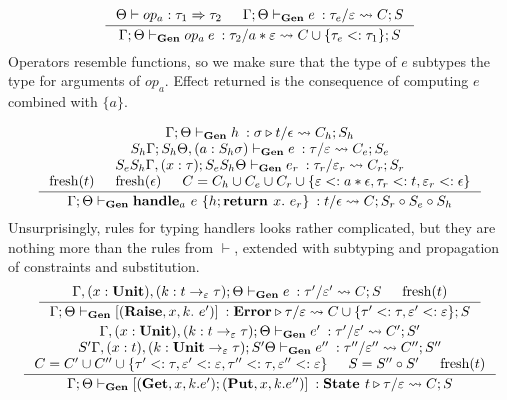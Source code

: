 \documentclass[declaration,shortabstract]{iithesis}
\theoremstyle{definition} \newtheorem{definition}{Definition}[section]
\newcommand{\gens}[6][\Gamma;\Theta]{\ensuremath{{{#1} \vdash_\textbf{Gen} {#2} \: : {#3}/{#4}} \rightsquigarrow {#5};{#6}}}
\newcommand{\arrow}[3]{{#1}\rightarrow_{#2}{#3}}
\newcommand{\fresh}[1]{\ensuremath{\operatorname{fresh}({#1})}}
\begin{document}
\begin{gather*}
\inference{
    \Theta \vdash op_a : \tau_1 \Rightarrow \tau_2 &
    \gens{e}{\tau_e}{\varepsilon}{C}{S}
}{
    \gens{op_a \: e}{\tau_2}{a * \varepsilon}{C \cup \{\tau_e <: \tau_1 \}}{S}
}
\end{gather*}
Operators resemble functions, so we make sure that the type of $e$ subtypes the type for arguments of $op_a$.
Effect returned is the consequence of computing $e$ combined with $\{a\}$.

\begin{gather*}
\begin{gathered}
\inference{
\gens{h}{\sigma \triangleright t}{\epsilon}{C_h}{S_h} \\
\gens[S_h\Gamma; S_h\Theta, (a:S_h\sigma)]{e}{\tau}{\varepsilon}{C_e}{S_e} \\
\gens[S_e S_h \Gamma,(x:\tau); S_e S_h \Theta]{e_r}{\tau_r}{\varepsilon_r}{C_r}{S_r} \\
\fresh{t} & \fresh{\epsilon} &
C = C_h \cup C_e \cup C_r \cup\{\varepsilon <: a * \epsilon, \tau_r <: t, \varepsilon_r <: \epsilon \}
}{
\gens{\textbf{handle}_a \ e\ \{h;\textbf{return } x.\ e_r\}}{t}{\epsilon}{C}{S_r \circ S_e \circ S_h}
}
\end{gathered}
\end{gather*}
Unsurprisingly, rules for typing handlers looks rather complicated,
but they are nothing more than the rules from $\vdash$, extended with subtyping and propagation of constraints and substitution.
\begin{gather*}
\begin{gathered}
\inference{ 
\gens[\Gamma,(x:\textbf{Unit}), (k:\arrow{t}{\varepsilon}{\tau});\Theta]{e}{\tau'}{\varepsilon'}{C}{S} &
\fresh{t}
}{
\gens{ [(\textbf{Raise}, x, k.\ e')]}{\textbf{Error}\triangleright \tau}{\varepsilon}{C\cup\{\tau' <: \tau, \varepsilon' <: \varepsilon\}}{S}
}
\\
\inference{
\gens[\Gamma,(x:\textbf{Unit}), (k:\arrow{t}{\varepsilon}{\tau});\Theta] 
{e'}{\tau'}{\varepsilon'}{C'}{S'}
\\
\gens[S'\Gamma,(x:t), (k:\arrow{\textbf{Unit}}{\varepsilon}{\tau});S' \Theta]
{e''}{\tau''}{\varepsilon''}{C''}{S''} \\
C = C' \cup C'' \cup \{ \tau' <: \tau,  \varepsilon' <: \varepsilon, \tau'' <: \tau,  \varepsilon'' <: \varepsilon \} &
S = S'' \circ S' & \fresh{t}
}{
\gens{ [(\textbf{Get}, x, k. e');(\textbf{Put}, x, k. e'')]}{\textbf{State } t\triangleright \tau}{\varepsilon}{C}{S}
}
\end{gathered}
\end{gather*}
\setlength{\jot}{3pt}
\end{document}
